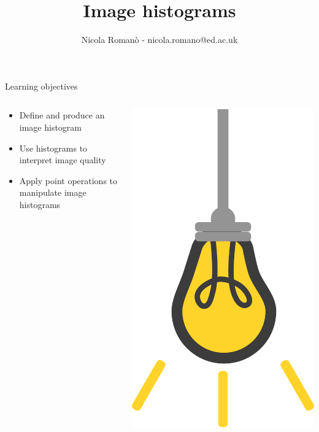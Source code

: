 \documentclass[9pt, aspectratio=169]{beamer}
\author{Nicola Roman\`o - nicola.romano@ed.ac.uk}
\title{Image histograms}
\date{}
\begin{document}

\begin{frame}
    \titlepage
\end{frame}

\begin{frame}
    {Learning objectives}
    \begin{columns}
        \begin{column}{0.8\textwidth}
            \begin{itemize}
                \item Define and produce an image histogram
                \item Use histograms to interpret image quality
                \item Apply point operations to manipulate image histograms
            \end{itemize}
        \end{column}
        \begin{column}{0.2\textwidth}
            \includegraphics[angle=-30, origin=tr, width=1.5\textwidth]{lightbulb.png}

\end{column}
\end{columns}
\end{frame}
\end{document}
